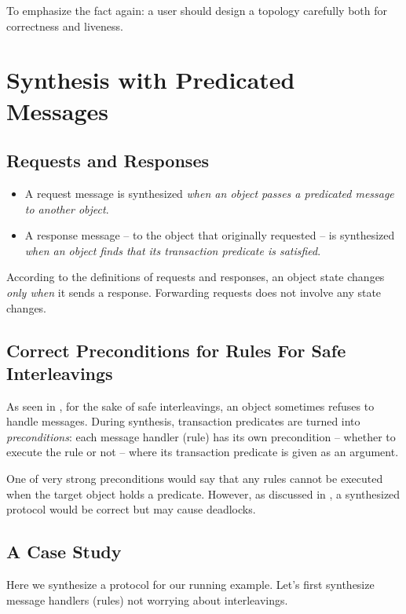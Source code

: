 \documentclass[format=manuscript]{acmart}
\begin{document}
To emphasize the fact again: a user should design a topology carefully both for
correctness and liveness.

\section{Synthesis with Predicated Messages}

\subsection{Requests and Responses}

\begin{itemize}
\item A request message is synthesized \emph{when an object passes a predicated
  message to another object}.
\item A response message -- to the object that originally requested -- is
  synthesized \emph{when an object finds that its transaction predicate is
    satisfied}.
\end{itemize}

According to the definitions of requests and responses, an object state changes
\emph{only when} it sends a response. Forwarding requests does not involve any
state changes.

\subsection{Correct Preconditions for Rules For Safe Interleavings}

As seen in , for the sake of safe interleavings, an object
sometimes refuses to handle messages. During synthesis, transaction predicates
are turned into \emph{preconditions}: each message handler (rule) has its own
precondition -- whether to execute the rule or not -- where its transaction
predicate is given as an argument.

One of very strong preconditions would say that any rules cannot be executed
when the target object holds a predicate. However, as discussed in
, a synthesized protocol would be correct but may cause
deadlocks.

\subsection{A Case Study}

Here we synthesize a protocol for our running example. Let's first synthesize
message handlers (rules) not worrying about interleavings.
\end{document}
